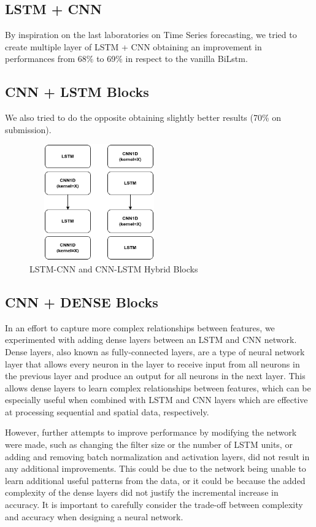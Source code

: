 \documentclass[11pt]{article}
\begin{document}
\subsection{LSTM + CNN}
By inspiration on the last laboratories on Time Series forecasting, we tried to create multiple layer of LSTM + CNN
obtaining an improvement in performances from 68\% to 69\% in respect to the vanilla BiLstm.
\subsection{CNN + LSTM Blocks}
We also tried to do the opposite obtaining slightly better results (70\% on submission).
\begin{figure}[h]
  \centering
  \includegraphics[width=6cm, height=5cm]{LSTMCNN}
  \caption{LSTM-CNN and CNN-LSTM Hybrid Blocks}
\end{figure}

\subsection{CNN + DENSE Blocks}
In an effort to capture more complex relationships between features, we experimented with adding dense layers between an LSTM and CNN network.
Dense layers, also known as fully-connected layers, are a type of neural network layer that allows every neuron in the layer to receive input from all neurons in the previous layer and produce an output for all neurons in the next layer.
This allows dense layers to learn complex relationships between features, which can be especially useful when combined with LSTM and CNN layers which are effective at processing sequential and spatial data, respectively.

However, further attempts to improve performance by modifying the network were made, such as changing the filter size or the number of LSTM units, or adding and removing batch normalization and activation layers, did not result in any additional improvements.
This could be due to the network being unable to learn additional useful patterns from the data, or it could be because the added complexity of the dense layers did not justify the incremental increase in accuracy.
It is important to carefully consider the trade-off between complexity and accuracy when designing a neural network.
\end{document}
